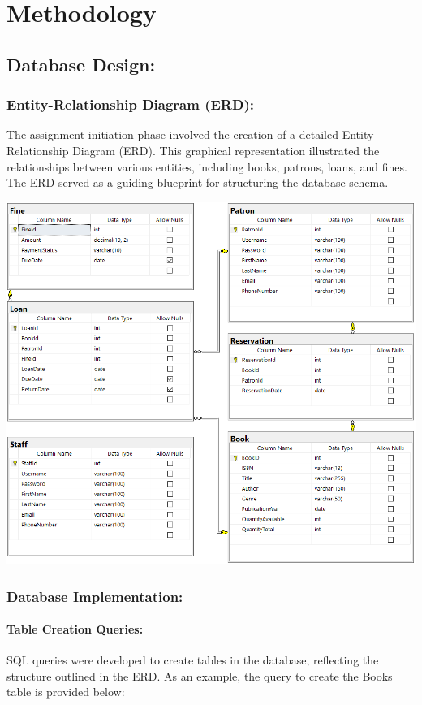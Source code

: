 \documentclass[12pt,titlepage,a4paper]{report}
\begin{document}
\chapter{Methodology}

\section{Database Design:}

\subsection{Entity-Relationship Diagram (ERD):}
The assignment initiation phase involved the creation of a detailed Entity- Relationship Diagram (ERD). This graphical representation illustrated the relationships between various entities, including books, patrons, loans, and fines. The ERD served as a guiding blueprint for structuring the database schema.

\begin{center}
    \includegraphics[width=.9\textwidth]{images/figures/Database Diagram.png}
\end{center}

\subsection{Database Implementation:}

\subsubsection{Table Creation Queries:}
\noindent
SQL queries were developed to create tables in the database, reflecting the structure outlined in the ERD. As an example, the query to create the Books table is provided below:
\end{document}
